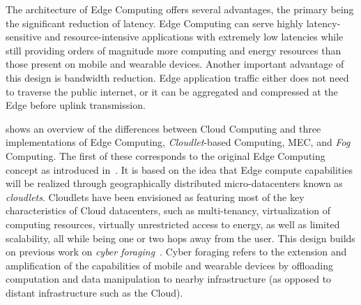 The architecture of Edge Computing offers several advantages, the primary being the significant reduction of latency.
Edge Computing can serve highly latency-sensitive and resource-intensive applications with extremely low latencies while still providing orders of magnitude more computing and energy resources than those present on mobile and wearable devices.
Another important advantage of this design is bandwidth reduction.
Edge application traffic either does not need to traverse the public internet, or it can be aggregated and compressed at the Edge before uplink transmission.



 shows an overview of the differences between Cloud Computing and three implementations of Edge Computing, \emph{Cloudlet}-based Computing, \gls{MEC}, and \emph{Fog} Computing.
The first of these corresponds to the original Edge Computing concept as introduced in~\citeauthor{satyanarayanan2009case}.
It is based on the idea that Edge compute capabilities will be realized through geographically distributed micro-datacenters known as \emph{cloudlets}.
Cloudlets have been envisioned as featuring most of the key characteristics of Cloud datacenters, such as multi-tenancy, virtualization of computing resources, virtually unrestricted access to energy, as well as limited scalability, all while being one or two hops away from the user.
This design builds on previous work on \emph{cyber foraging}~\cite{noble1997agile,flinn1999energy,satyanarayanan2001pervasive}.
Cyber foraging refers to the extension and amplification of the capabilities of mobile and wearable devices by offloading computation and data manipulation to nearby infrastructure (as opposed to distant infrastructure such as the Cloud).

